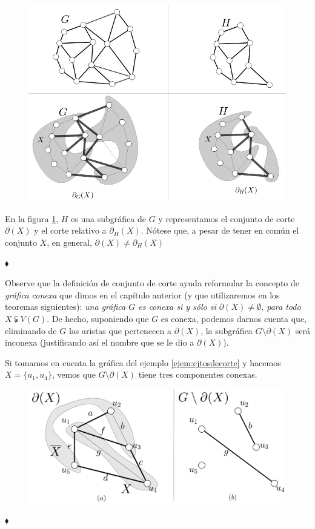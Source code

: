 \begin{ejem}\label{ejem:relativos}
\begin{figure}[H]
\vspace{-2.1cm}
    \centering
    \includegraphics[scale=0.6]{img/imgchapter2/cortesrelativos.jpg}
    \caption{}
    \label{fig:corterelativo}
\end{figure}
En la figura \ref{fig:corterelativo}, $H$ es una subgráfica de $G$ y representamos el conjunto de corte $\partial(X)$ y el corte relativo a $\partial_{H}(X)$. Nótese que, a pesar de tener en común el conjunto $X$, en general, $\partial(X) \neq \partial_{H}(X)$

\hfill $\blacklozenge$
\end{ejem}
Observe que la definición de conjunto de corte ayuda reformular la concepto de \textit{gráfica conexa} que dimos en el capítulo anterior (y que utilizaremos en los teoremas siguientes): \textit{una gráfica $G$ es conexa si y sólo si $\partial(X) \neq \emptyset$, para todo $X \subsetneqq V(G)$}. De hecho, suponiendo que $G$ es conexa, podemos darnos cuenta que, eliminando de $G$ las aristas que pertenecen a $\partial(X)$, la subgráfica $G\setminus \partial(X)$ será inconexa (justificando así el nombre que se le dio a $\partial(X)$). 
\begin{ejem}
Si tomamos en cuenta la gráfica del ejemplo \ref{ejem:cjtosdecorte} y hacemos $X=\{u_{1},u_{4}\}$, vemos que $G\setminus \partial(X)$ tiene tres componentes conexas.
\begin{figure}[H]
     \centering
     \includegraphics[scale=0.2]{img/imgchapter2/cortescompconexas.jpg}
     \caption{}
     \label{fig:cortescompconexas}
\end{figure}
\hfill $\blacklozenge$
\end{ejem}
